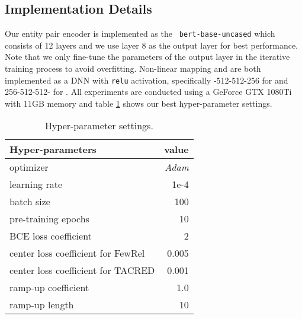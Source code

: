 \documentclass[11pt]{article}
\begin{document}
    \subsection{Implementation Details}
        Our entity pair encoder is implemented as the \texttt{ bert-base-uncased} which consists of 12 layers and we use layer 8 as the output layer for best performance. Note that we only fine-tune the parameters of the output layer in the iterative training process to avoid overfitting. Non-linear mapping  and  are both implemented as a DNN with \texttt{relu} activation, specifically -512-512-256 for  and 256-512-512- for . All experiments are conducted using a GeForce GTX 1080Ti with 11GB memory and table \ref{tab:hyper} shows our best hyper-parameter settings.
        \begin{table}
            \centering
            \begin{tabular}{lr}
            \toprule
            Hyper-parameters & value\\
            \midrule
            optimizer & \textit{Adam}\\
            learning rate & 1e-4\\
            batch size & 100\\
            \midrule
            pre-training epochs  & 10\\
            BCE loss coefficient  & 2\\
            center loss coefficient  for FewRel & 0.005\\
            center loss coefficient  for TACRED & 0.001\\
            ramp-up coefficient  & 1.0\\
            ramp-up length  & 10\\
            \bottomrule
            \end{tabular}
            \caption{Hyper-parameter settings.}
            \label{tab:hyper}
        \end{table}
\end{document}

